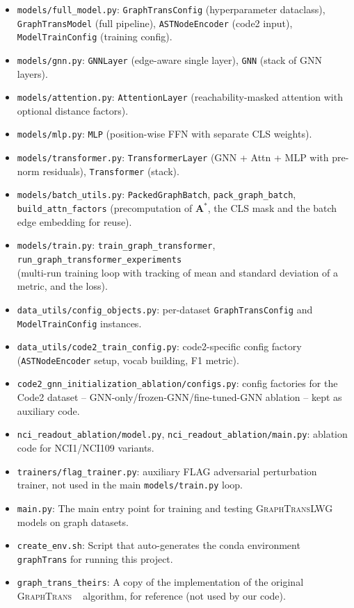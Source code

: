 \documentclass[11pt]{article}
\begin{document}
\begin{itemize}
  \item \texttt{models/full\_model.py}: \texttt{GraphTransConfig} (hyperparameter dataclass), \texttt{GraphTransModel} (full pipeline), \texttt{ASTNodeEncoder} (code2 input), \texttt{ModelTrainConfig} (training config).
  \item \texttt{models/gnn.py}: \texttt{GNNLayer} (edge-aware single layer), \texttt{GNN} (stack of GNN layers).
  \item \texttt{models/attention.py}: \texttt{AttentionLayer} (reachability-masked attention with optional distance factors).
  \item \texttt{models/mlp.py}: \texttt{MLP} (position-wise FFN with separate CLS weights).
  \item \texttt{models/transformer.py}: \texttt{TransformerLayer} (GNN + Attn + MLP with pre-norm residuals), \texttt{Transformer} (stack).
  \item \texttt{models/batch\_utils.py}: \texttt{PackedGraphBatch}, \texttt{pack\_graph\_batch}, \texttt{build\_attn\_factors} (precomputation of $\mathbf{A}^*$, the CLS mask and the batch edge embedding for reuse).
  \item \texttt{models/train.py}: \texttt{train\_graph\_transformer}, \texttt{run\_graph\_transformer\_experiments} \\ (multi-run training loop with tracking of mean and standard deviation of a metric, and the loss).
  \item \texttt{data\_utils/config\_objects.py}: per-dataset \texttt{GraphTransConfig} and \texttt{ModelTrainConfig} instances.
  \item \texttt{data\_utils/code2\_train\_config.py}: code2-specific config factory (\texttt{ASTNodeEncoder} setup, vocab building, F1 metric).
  \item \texttt{code2\_gnn\_initialization\_ablation/configs.py}: config factories for the \textsf{Code2} dataset --  GNN-only/frozen-GNN/fine-tuned-GNN ablation -- kept as auxiliary code.
  \item \texttt{nci\_readout\_ablation/model.py}, \texttt{nci\_readout\_ablation/main.py}: ablation code for \textsf{NCI1}/\textsf{NCI109} variants.
  \item \texttt{trainers/flag\_trainer.py}: auxiliary FLAG adversarial perturbation trainer, not used in the main \texttt{models/train.py} loop.
  \item \texttt{main.py}: The main entry point for training and testing \textsc{GraphTransLWG} models on graph datasets.
  \item \texttt{create\_env.sh}: Script that auto-generates the conda environment \texttt{graphTrans} for running this project.
  \item \texttt{graph\_trans\_theirs}: A copy of the implementation of the original \textsc{GraphTrans} ~\cite{wu2022representinglongrangecontextgraph} algorithm, for reference (not used by our code).
\end{itemize}
\end{document}
